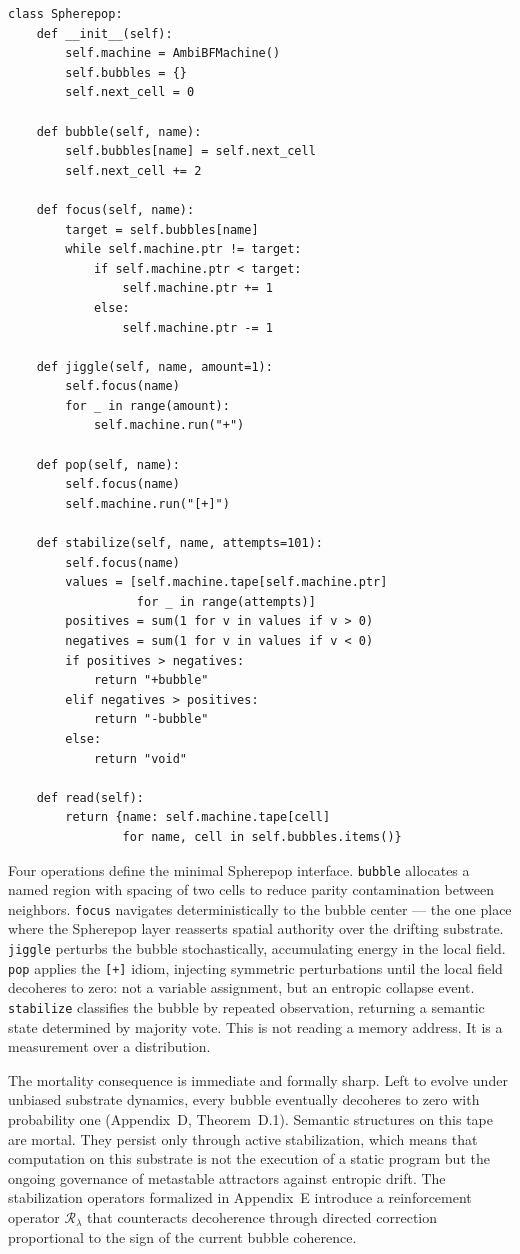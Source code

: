 \documentclass[12pt]{article}
\begin{document}
\begin{lstlisting}
class Spherepop:
    def __init__(self):
        self.machine = AmbiBFMachine()
        self.bubbles = {}
        self.next_cell = 0

    def bubble(self, name):
        self.bubbles[name] = self.next_cell
        self.next_cell += 2

    def focus(self, name):
        target = self.bubbles[name]
        while self.machine.ptr != target:
            if self.machine.ptr < target:
                self.machine.ptr += 1
            else:
                self.machine.ptr -= 1

    def jiggle(self, name, amount=1):
        self.focus(name)
        for _ in range(amount):
            self.machine.run("+")

    def pop(self, name):
        self.focus(name)
        self.machine.run("[+]")

    def stabilize(self, name, attempts=101):
        self.focus(name)
        values = [self.machine.tape[self.machine.ptr]
                  for _ in range(attempts)]
        positives = sum(1 for v in values if v > 0)
        negatives = sum(1 for v in values if v < 0)
        if positives > negatives:
            return "+bubble"
        elif negatives > positives:
            return "-bubble"
        else:
            return "void"

    def read(self):
        return {name: self.machine.tape[cell]
                for name, cell in self.bubbles.items()}
\end{lstlisting}

Four operations define the minimal Spherepop interface. \texttt{bubble}
allocates a named region with spacing of two cells to reduce parity
contamination between neighbors. \texttt{focus} navigates deterministically
to the bubble center --- the one place where the Spherepop layer reasserts
spatial authority over the drifting substrate. \texttt{jiggle} perturbs
the bubble stochastically, accumulating energy in the local field. \texttt{pop}
applies the \texttt{[+]} idiom, injecting symmetric perturbations until the
local field decoheres to zero: not a variable assignment, but an entropic
collapse event. \texttt{stabilize} classifies the bubble by repeated
observation, returning a semantic state determined by majority vote. This is
not reading a memory address. It is a measurement over a distribution.

The mortality consequence is immediate and formally sharp. Left to evolve under
unbiased substrate dynamics, every bubble eventually decoheres to zero with
probability one (Appendix~D, Theorem~D.1). Semantic structures on this tape are
mortal. They persist only through active stabilization, which means that
computation on this substrate is not the execution of a static program but the
ongoing governance of metastable attractors against entropic drift. The
stabilization operators formalized in Appendix~E introduce a reinforcement
operator $\mathcal{R}_\lambda$ that counteracts decoherence through directed
correction proportional to the sign of the current bubble coherence.
\end{document}

